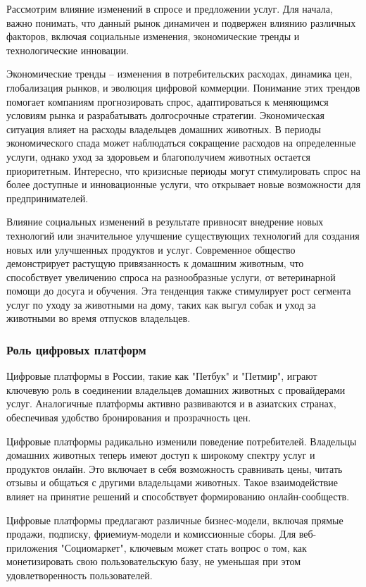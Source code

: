 Рассмотрим влияние изменений в спросе и предложении услуг. Для начала, важно понимать, что данный рынок динамичен и подвержен влиянию различных факторов, включая социальные изменения, экономические тренды и технологические инновации.

Экономические тренды – изменения в потребительских расходах, динамика цен, глобализация рынков, и эволюция цифровой коммерции. Понимание этих трендов помогает компаниям прогнозировать спрос, адаптироваться к меняющимся условиям рынка и разрабатывать долгосрочные стратегии. Экономическая ситуация влияет на расходы владельцев домашних животных. В периоды экономического спада может наблюдаться сокращение расходов на определенные услуги, однако уход за здоровьем и благополучием животных остается приоритетным. Интересно, что кризисные периоды могут стимулировать спрос на более доступные и инновационные услуги, что открывает новые возможности для предпринимателей.

Влияние социальных изменений в результате привносят внедрение новых технологий или значительное улучшение существующих технологий для создания новых или улучшенных продуктов и услуг. Современное общество демонстрирует растущую привязанность к домашним животным, что способствует увеличению спроса на разнообразные услуги, от ветеринарной помощи до досуга и обучения. Эта тенденция также стимулирует рост сегмента услуг по уходу за животными на дому, таких как выгул собак и уход за животными во время отпусков владельцев.
\subsubsection{Роль цифровых платформ}

Цифровые платформы в России, такие как "Петбук" и "Петмир", играют ключевую роль в соединении владельцев домашних животных с провайдерами услуг. Аналогичные платформы активно развиваются и в азиатских странах, обеспечивая удобство бронирования и прозрачность цен.

Цифровые платформы радикально изменили поведение потребителей. Владельцы домашних животных теперь имеют доступ к широкому спектру услуг и продуктов онлайн. Это включает в себя возможность сравнивать цены, читать отзывы и общаться с другими владельцами животных. Такое взаимодействие влияет на принятие решений и способствует формированию онлайн-сообществ.

Цифровые платформы предлагают различные бизнес-модели, включая прямые продажи, подписку, фриемиум-модели и комиссионные сборы. Для веб-приложения "Социомаркет", ключевым может стать вопрос о том, как монетизировать свою пользовательскую базу, не уменьшая при этом удовлетворенность пользователей.


